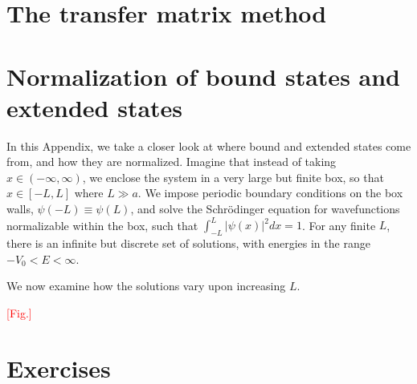 \documentclass[pra,12pt]{revtex4}
\begin{document}
\appendix
\section{The transfer matrix method}
\label{sec:appendix}


\section{Normalization of bound states and extended states}
\label{sec:normalization}

In this Appendix, we take a closer look at where bound and extended
states come from, and how they are normalized.  Imagine that instead
of taking $x \in (-\infty,\infty)$, we enclose the system in a very
large but finite box, so that $x \in [-L,L]$ where $L \gg a$.  We
impose periodic boundary conditions on the box walls, $\psi(-L) \equiv
\psi(L)$, and solve the Schr\"odinger equation for wavefunctions
normalizable within the box, such that $\int_{-L}^{L} |\psi(x)|^2 dx =
1$.  For any finite $L$, there is an infinite but discrete set of
solutions, with energies in the range $-V_0 <E < \infty$.

We now examine how the solutions vary upon increasing $L$.

\textcolor{red}{[Fig.]}





\section*{Exercises}
\end{document}
